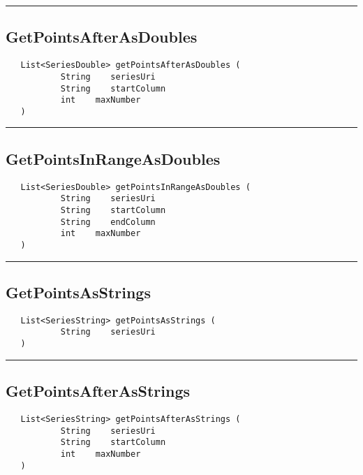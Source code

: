 \rule{15cm}{2pt}
\subsection{GetPointsAfterAsDoubles}
\label{Api:GetPointsAfterAsDoubles}
\begin{verbatim}
   List<SeriesDouble> getPointsAfterAsDoubles (
           String    seriesUri
           String    startColumn
           int    maxNumber
   )
\end{verbatim}



\rule{15cm}{2pt}
\subsection{GetPointsInRangeAsDoubles}
\label{Api:GetPointsInRangeAsDoubles}
\begin{verbatim}
   List<SeriesDouble> getPointsInRangeAsDoubles (
           String    seriesUri
           String    startColumn
           String    endColumn
           int    maxNumber
   )
\end{verbatim}



\rule{15cm}{2pt}
\subsection{GetPointsAsStrings}
\label{Api:GetPointsAsStrings}
\begin{verbatim}
   List<SeriesString> getPointsAsStrings (
           String    seriesUri
   )
\end{verbatim}



\rule{15cm}{2pt}
\subsection{GetPointsAfterAsStrings}
\label{Api:GetPointsAfterAsStrings}
\begin{verbatim}
   List<SeriesString> getPointsAfterAsStrings (
           String    seriesUri
           String    startColumn
           int    maxNumber
   )
\end{verbatim}



